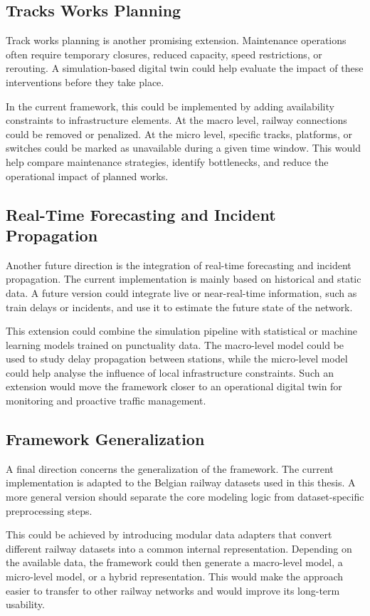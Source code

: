 \subsection{Tracks Works Planning}
Track works planning is another promising extension. Maintenance operations often require temporary closures, reduced 
capacity, speed restrictions, or rerouting. A simulation-based digital twin could help evaluate the impact of these 
interventions before they take place.

In the current framework, this could be implemented by adding availability constraints to infrastructure elements. At the 
macro level, railway connections could be removed or penalized. At the micro level, specific tracks, platforms, or switches 
could be marked as unavailable during a given time window. This would help compare maintenance strategies, identify 
bottlenecks, and reduce the operational impact of planned works.

\subsection{Real-Time Forecasting and Incident Propagation}
Another future direction is the integration of real-time forecasting and incident propagation. The current implementation 
is mainly based on historical and static data. A future version could integrate live or near-real-time information, such as 
train delays or incidents, and use it to estimate the future state of the network.

This extension could combine the simulation pipeline with statistical or machine learning models trained on punctuality 
data. The macro-level model could be used to study delay propagation between stations, while the micro-level model could 
help analyse the influence of local infrastructure constraints. Such an extension would move the framework closer to an 
operational digital twin for monitoring and proactive traffic management.

\subsection{Framework Generalization}
A final direction concerns the generalization of the framework. The current implementation is adapted to the Belgian 
railway datasets used in this thesis. A more general version should separate the core modeling logic from dataset-specific 
preprocessing steps.

This could be achieved by introducing modular data adapters that convert different railway datasets into a common internal 
representation. Depending on the available data, the framework could then generate a macro-level model, a micro-level 
model, or a hybrid representation. This would make the approach easier to transfer to other railway networks and would 
improve its long-term usability.

